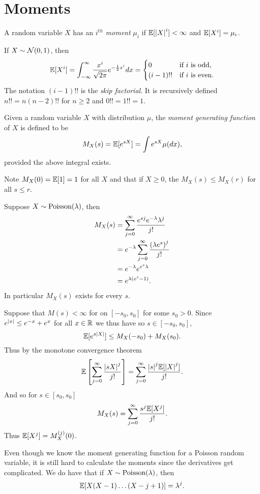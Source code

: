 \section{Moments}
\begin{defn}
    A random variable $X$ has an \emph{$i^{th}$ moment} $\mu_i$ if ${\mathbb{E}}[{\left\lvert X\right\rvert}^i]<\infty$ and ${\mathbb{E}}[X^i]=\mu_i$.
\end{defn}
\begin{ex}
    If $X \sim {{\mathcal{N}}}(0,1)$, then 
    \[{\mathbb{E}}[X^i] = \int_{-\infty}^\infty \frac{x^i}{\sqrt{2\pi}} e^{-\frac{1}{2}x^i}dx = \begin{cases}
        0&\text{if } i \text{ is odd},\\
        (i-1)!! & \text{if } i \text{ is even}.
    \end{cases}\]
    The notation $(i-1)!!$ is the \emph{skip factorial}. It is recursively defined $n!! = n(n-2)!!$ for $n \ge 2$ and $0!!=1!! = 1$. 
\end{ex}
\begin{defn}
    Given a random variable $X$ with distribution $\mu$, the \emph{moment generating function} of $X$ is defined to be
    \[M_X(s) = {\mathbb{E}}[e^{sX}] = \int e^{sX}\mu(dx),\]
    provided the above integral exists.
\end{defn}
Note $M_X(0) ={\mathbb{E}}[1]=1$ for all $X$ and that if $X \ge 0$, the $M_X(s) \le M_X(r)$ for all $s \le r$. 
\begin{ex}
    Suppose $X \sim \text{Poisson}(\lambda)$, then
    \begin{align*}
        M_X(s)& = \sum_{j=0}^\infty \frac{e^{sj}e^{-\lambda}\lambda^j}{j!}\\
        &=e^{-\lambda}\sum_{j=0}^\infty \frac{\left(\lambda e^s\right)^j}{j!}\\
        &=e^{-\lambda}e^{e^s \lambda}\\
        &=e^{\lambda\left(e^s-1\right)}.
    \end{align*}
    In particular $M_X(s)$ exists for every $s$.
\end{ex}
Suppose that $M(s) < \infty$ for on $[-s_0,s_0]$ for some $s_0 > 0$. Since $e^{{\left\lvert x\right\rvert}}\le e^{-x}+e^{x}$ for all $x \in {\mathbb R}$ we thus have so $s \in [-s_0,s_0]$,
\[{\mathbb{E}}[e^{s{\left\lvert X\right\rvert}}] \le M_X(-s_0)+M_X(s_0). \]
Thus by the monotone convergence theorem 
\[{\mathbb{E}}\left[\sum_{j=0}^\infty \frac{{\left\lvert sX\right\rvert}^j}{j!}\right]=\sum_{j=0}^\infty \frac{{\left\lvert s\right\rvert}^j{\mathbb{E}}[{\left\lvert X\right\rvert}^j]}{j!}. \]
And so for $s \in [s_0,s_0]$
\[M_X(s) = \sum_{j=0}^\infty \frac{s^j {\mathbb{E}}[X^j]}{j!}. \]
Thus ${\mathbb{E}}[X^j] = M^{(j)}_X(0)$. 
\begin{remark}
    Even though we know the moment generating function for a Poisson random variable, it is still hard to calculate the moments since the derivatives get complicated. We do have that if $X \sim \text{Poisson}(\lambda)$, then 
    \[{\mathbb{E}}[X(X-1)\ldots (X-j+1)] = \lambda^j. \]
\end{remark}
